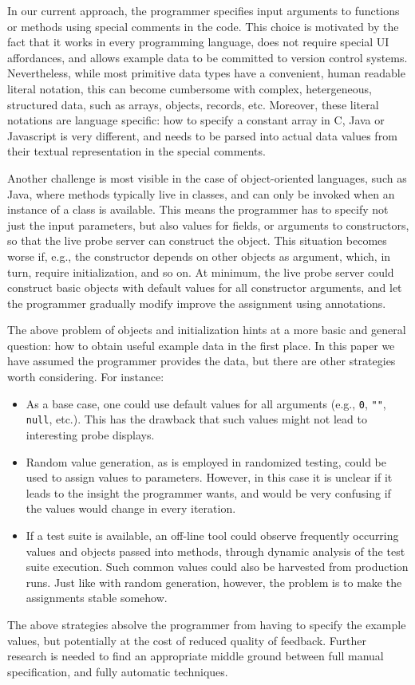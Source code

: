 \documentclass[english,submission]{programming}
\begin{document}
In our current approach, the programmer specifies input arguments to functions or methods using special comments in the code. This choice is motivated by the fact that it works in every programming language, does not require special UI affordances, and allows example data to be committed to version control systems. Nevertheless, while most primitive data types have a convenient, human readable literal notation, this can become cumbersome with complex, hetergeneous, structured data, such as arrays, objects, records, etc.  Moreover, these literal notations are language specific: how to specify a constant array in C, Java or Javascript is very different, and needs to be parsed into actual data values from their textual representation in the special comments. 

Another challenge is most visible in the case of object-oriented languages, such as Java, where methods typically live in classes, and can only be invoked when an instance of a class is available. This means the programmer has to specify not just the input parameters, but also values for fields, or arguments to constructors, so that the live probe server can construct the object. This situation becomes worse if, e.g., the constructor depends on other objects as argument, which, in turn, require initialization, and so on. At minimum, the live probe server could construct basic objects with default values for all constructor arguments, and let the programmer gradually modify improve the assignment using annotations. 

The above problem of objects and initialization hints at a more basic and general question: how to obtain useful example data in the first place. In this paper we have assumed the programmer provides the data, but there are other strategies worth considering. For instance:
\begin{itemize}
  \item As a base case, one could use default values for all arguments (e.g., \lstinline{0}, \lstinline{""}, \lstinline{null}, etc.). This has the drawback that such values might not lead to interesting probe displays. 
  \item Random value generation, as is employed in randomized testing, could be used to assign values to parameters. However, in this case it is unclear if it leads to the insight the programmer wants, and would be very confusing if the values would change in every iteration.
  \item If a test suite is available, an off-line tool could observe frequently occurring values and objects passed into methods, through dynamic analysis of the test suite execution. Such common values could also be harvested from production runs. Just like with random generation, however, the problem is to make the assignments stable somehow. 
\end{itemize}
The above strategies absolve the programmer from having to specify the example values, but potentially at the cost of reduced quality of feedback. Further research is needed to find an appropriate middle ground between full manual specification, and fully automatic techniques.
\end{document}
